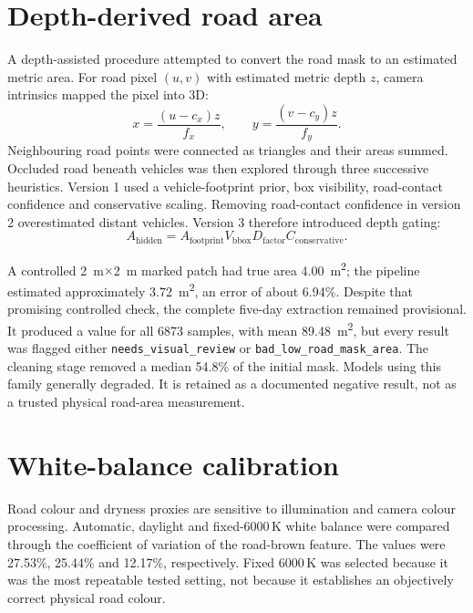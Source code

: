 \documentclass[11pt,a4paper,oneside]{report}
\begin{document}
\section{Depth-derived road area}
A depth-assisted procedure attempted to convert the road mask to an estimated
metric area. For road pixel $(u,v)$ with estimated metric depth $z$, camera
intrinsics mapped the pixel into 3D:
\begin{equation}
  x=\frac{(u-c_x)z}{f_x}, \qquad
  y=\frac{(v-c_y)z}{f_y}.
\end{equation}
Neighbouring road points were connected as triangles and their areas summed.
Occluded road beneath vehicles was then explored through three successive
heuristics. Version 1 used a vehicle-footprint prior, box visibility,
road-contact confidence and conservative scaling. Removing road-contact
confidence in version 2 overestimated distant vehicles. Version 3 therefore
introduced depth gating:
\begin{equation}
  A_{\mathrm{hidden}} =
  A_{\mathrm{footprint}} V_{\mathrm{bbox}} D_{\mathrm{factor}}
  C_{\mathrm{conservative}} .
\end{equation}

A controlled \SI{2}{\metre}$\times$\SI{2}{\metre} marked patch had true area
\SI{4.00}{\square\metre}; the pipeline estimated approximately
\SI{3.72}{\square\metre}, an error of about 6.94\%. Despite that promising
controlled check, the complete five-day extraction remained provisional. It
produced a value for all \num{6873} samples, with mean
\SI{89.48}{\square\metre}, but every result was flagged either
\texttt{needs\_visual\_review} or \texttt{bad\_low\_road\_mask\_area}.
The cleaning stage removed a median 54.8\% of the initial mask. Models using
this family generally degraded. It is retained as a documented negative result,
not as a trusted physical road-area measurement.

\section{White-balance calibration}
Road colour and dryness proxies are sensitive to illumination and camera colour
processing. Automatic, daylight and fixed-6000\,K white balance were compared
through the coefficient of variation of the road-brown feature. The values were
27.53\%, 25.44\% and 12.17\%, respectively. Fixed 6000\,K was selected because
it was the most repeatable tested setting, not because it establishes an
objectively correct physical road colour.
\end{document}
